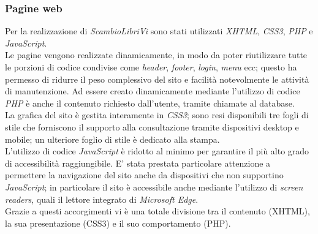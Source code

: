 \documentclass[openany,10pt,a4paper]{article}
\begin{document}
		\subsubsection{Pagine web}
			Per la realizzazione di  \textit{ScambioLibriVi} sono stati utilizzati \textit{XHTML}, \textit{CSS3}, \textit{PHP} e \textit{JavaScript}. \\
			Le pagine vengono realizzate dinamicamente, in modo da poter riutilizzare tutte le porzioni di codice condivise come \textit{header}, \textit{footer}, \textit{login}, \textit{menu} ecc; questo ha permesso di ridurre il peso complessivo del sito e facilità notevolmente le attività di manutenzione. Ad essere creato dinamicamente mediante l'utilizzo di codice \textit{PHP} è anche il contenuto richiesto dall'utente, tramite chiamate al database.
			\\ La grafica del sito è gestita interamente in \textit{CSS3}; sono resi disponibili tre fogli di stile che forniscono il supporto alla consultazione tramite dispositivi desktop e mobile; un ulteriore foglio di stile è dedicato alla stampa. 
			\\ L'utilizzo di codice \textit{JavaScript} è ridotto al minimo per garantire il più alto grado di accessibilità raggiungibile. E' stata prestata particolare attenzione a permettere la navigazione del sito anche da dispositivi che non supportino \textit{JavaScript}; in particolare il sito è accessibile anche mediante l'utilizzo di \textit{screen readers}, quali il lettore integrato di \textit{Microsoft Edge}.
			\\ Grazie a questi accorgimenti vi è una totale divisione tra il contenuto (XHTML), la sua presentazione (CSS3) e il suo comportamento (PHP).
			
\end{document}
